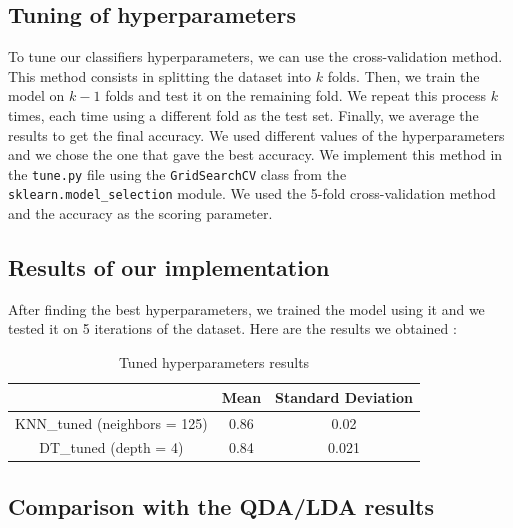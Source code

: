 \documentclass[12pt]{article}
\begin{document}
\subsection{Tuning of hyperparameters}
	To tune our classifiers hyperparameters, we can use the cross-validation method.
	This method consists in splitting the dataset into $k$ folds.
	Then, we train the model on $k-1$ folds and test it on the remaining fold.
	We repeat this process $k$ times, each time using a different fold as the test set.
	Finally, we average the results to get the final accuracy. We used different values of the hyperparameters and we chose the one that gave the best accuracy.
	We implement this method in the \verb|tune.py| file using
	the \verb|GridSearchCV| class from the \verb|sklearn.model_selection| module. We used the 5-fold cross-validation method and the accuracy as the scoring parameter.
\subsection{Results of our implementation} 
	After finding the best hyperparameters, we trained the model using it and we tested it on 5 iterations of the dataset. Here are the results we obtained :
	\begin{table}[!h]
		\centering
		\begin{tabular}{|c|c|c|}
		\hline
													 						& Mean & Standard Deviation \\ \hline
		KNN\_tuned (neighbors = 125)       & 0.86 & 0.02              \\ \hline
		DT\_tuned (depth = 4)              & 0.84 & 0.021              \\ \hline
		\end{tabular}
		\caption{Tuned hyperparameters results}
		\label{tab:results-tune}	
	\end{table}

\subsection{Comparison with the QDA/LDA results}
\end{document}
